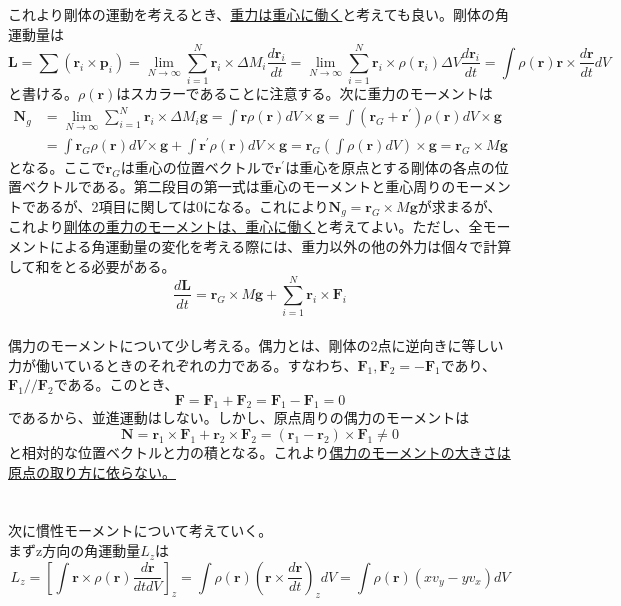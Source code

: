 \documentclass{jsarticle}
\begin{document}
これより剛体の運動を考えるとき、\underline{重力は重心に働く}と考えても良い。剛体の角運動量は
\begin{equation}
\displaystyle
\bm{L}=\sum(\bm{r}_{i}\times\bm{p}_{i})=\lim_{N\to\infty}\sum_{i=1}^{N}\bm{r}_{i}\times\Delta M_{i}\frac{d\bm{r}_{i}}{dt}=\lim_{N\to\infty}\sum_{i=1}^{N}\bm{r}_{i}\times\rho(\bm{r}_{i})\Delta V\frac{d\bm{r}_{i}}{dt}=\int\rho(\bm{r})\bm{r}\times\frac{d\bm{r}}{dt}dV
\end{equation}
と書ける。\(\rho(\bm{r})\)はスカラーであることに注意する。次に重力のモーメントは
\begin{align}
\bm{N}_{g}&=\lim_{N\to\infty}\sum_{i=1}^{N}\bm{r}_{i}\times\Delta M_{i}\bm{g}=\int\bm{r}\rho(\bm{r})dV\times\bm{g}=\int(\bm{r}_{G}+\bm{r}^{\prime})\rho(\bm{r})dV\times\bm{g}\nonumber\\
&=\int\bm{r}_{G}\rho(\bm{r})dV\times\bm{g}+\int\bm{r}^{\prime}\rho(\bm{r})dV\times\bm{g}=\bm{r}_{G}\left(\int\rho(\bm{r})dV\right)\times\bm{g}=\bm{r}_{G}\times M\bm{g}
\end{align}
となる。ここで\(\bm{r}_{G}\)は重心の位置ベクトルで\(\bm{r}^{\prime}\)は重心を原点とする剛体の各点の位置ベクトルである。第二段目の第一式は重心のモーメントと重心周りのモーメントであるが、2項目に関しては0になる。これにより\(\bm{N}_{g}=\bm{r}_{G}\times M\bm{g}\)が求まるが、これより\underline{剛体の重力のモーメントは、重心に働く}と考えてよい。ただし、全モーメントによる角運動量の変化を考える際には、重力以外の他の外力は個々で計算して和をとる必要がある。
\begin{equation}
\frac{d\bm{L}}{dt}=\bm{r}_{G}\times M\bm{g}+\sum_{i=1}^{N}\bm{r}_{i}\times\bm{F}_{i}
\end{equation}
\\
偶力のモーメントについて少し考える。偶力とは、剛体の2点に逆向きに等しい力が働いているときのそれぞれの力である。すなわち、\(\bm{F}_{1},\bm{F}_{2}=-\bm{F}_{1}\)であり、\(\bm{F}_{1}//\bm{F}_{2}\)である。このとき、
\[\bm{F}=\bm{F}_{1}+\bm{F}_{2}=\bm{F}_{1}-\bm{F}_{1}=0\]
であるから、並進運動はしない。しかし、原点周りの偶力のモーメントは
\[\bm{N}=\bm{r}_{1}\times\bm{F}_{1}+\bm{r}_{2}\times\bm{F}_{2}=(\bm{r}_{1}-\bm{r}_{2})\times\bm{F}_{1}\neq0\]
と相対的な位置ベクトルと力の積となる。これより\underline{偶力のモーメントの大きさは原点の取り方に依らない。}\\
\\
\\
次に慣性モーメントについて考えていく。\\
まずz方向の角運動量\(L_{z}\)は
\begin{equation}
L_{z}=\left[\int\bm{r}\times\rho(\bm{r})\frac{d\bm{r}}{dt dV}\right]_{z}=\int\rho(\bm{r})\left(\bm{r}\times\frac{d\bm{r}}{dt}\right)_{z}dV=\int\rho(\bm{r})(xv_{y}-yv_{x})dV
\end{equation}
\end{document}
